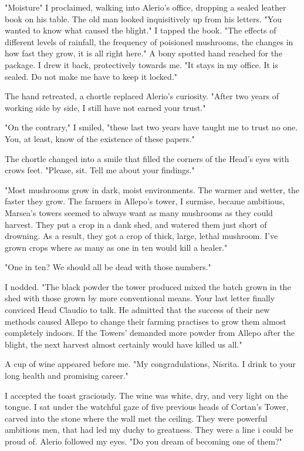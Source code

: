 \documentclass{article}
\begin{document}
"Moisture" I proclaimed, walking into Alerio's office, dropping a sealed leather book on his table. The old man looked inquisitively up from his letters. "You wanted to know what caused the blight." I tapped the book. "The effects of different levels of rainfall, the frequency of poisioned mushrooms, the changes in how fast they grow, it is all right here." A bony spotted hand reached for the package. I drew it back, protectively towards me. "It stays in my office. It is sealed. Do not make me have to keep it locked."

The hand retreated, a chortle replaced Alerio's curiosity. "After two years of working side by side, I still have not earned your trust."

"On the contrary," I smiled, "these last two years have taught me to trust no one. You, at least, know of the existence of these papers."

The chortle changed into a smile that filled the corners of the Head's eyes with crows feet. "Please, sit. Tell me about your findings."

"Most mushrooms grow in dark, moist environments. The warmer and wetter, the faster they grow. The farmers in Allepo's tower, I surmise, became ambitious, Marsea's towers seemed to always want as many mushrooms as they could harvest. They put a crop in a dank shed, and watered them just short of drowning. As a result, they got a crop of thick, large, lethal mushroom. I've grown crops where as many as one in ten would kill a healer."

"One in ten? We should all be dead with those numbers."

I nodded. "The black powder the tower produced mixed the batch grown in the shed with those grown by more conventional means. Your last letter finally conviced Head Claudio to talk. He admitted that the success of their new methods caused Allepo to change their farming practises to grow them almost completely indoors. If the Towers' demanded more powder from Allepo after the blight, the next harvest almost certainly would have killed us all."

A cup of wine appeared before me. "My congradulations, Nisrita. I drink to your long health and promising career."

I accepted the toast graciously. The wine was white, dry, and very light on the tongue. I sat under the watchful gaze of five previous heads of Cortan's Tower,  carved into the stone where the wall met the ceiling. They were powerful ambitious men, that had led my duchy to greatness. They were a line i could be proud of. Alerio followed my eyes. "Do you dream of becoming one of them?"
\end{document}
